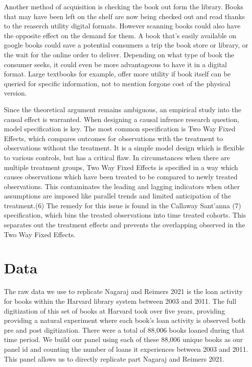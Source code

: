 \documentclass{article}
\begin{document}
Another method of acquisition is checking the book out form the library. Books that may have been left on the shelf are now being checked out and read thanks to the reaserch utility digital formats. However scanning books could also have the opposite effect on the demand for them. A book that’s easily available on google books could save a potential consumers a trip the book store or library, or the wait for the online order to deliver. Depending on what type of book the consumer seeks, it could even be more advantageous to have it in a digital format. Large textbooks for example, offer more utility if book itself can be queried for specific information, not to mention forgone cost of the physical version.

Since the theoretical argument remains ambiguous, an empirical study into the causal effect is warranted. When designing a causal infrence research question, model specification is key. The most common specification is Two Way Fixed Effects, which compares outcomes for observations with the treatment to observations without the treatment. It is a simple model design which is flexible to various controls, but has a critical flaw. In circumstances when there are multiple treatment groups, Two Way Fixed Effects is specified in a way which causes observations which have been treated to be compared to newly treated observations. This contaminates the leading and lagging indicators when other assumptions are imposed like parallel trends and limited anticipation of the treatment.(6) The remedy for this issue is found in the Callaway Sant'anna (7) specification, which bins the treated observations into time treated cohorts. This separates out the treatment effects and prevents the overlapping observed in the Two Way Fixed Effects.

\section{Data}
The raw data we use to replicate Nagaraj and Reimers 2021 is the loan activity for books within the Harvard library system between 2003 and 2011. The full digitization of this set of books at Harvard took over five years, providing providing a natural experiment where each book's loan activity is observed both pre and post digitization. There were a total of 88,006 books loaned during that time period. We build our panel using each of these 88,006 unique books as our panel id and counting the number of loans it experiences between 2003 and 2011. This panel allows us to directly replicate part Nagaraj and Reimers 2021. 
\end{document}
